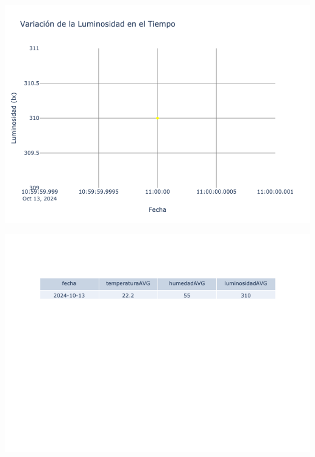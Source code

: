 \documentclass{article}
\begin{document}
    \noindent
    \begin{minipage}{0.48\textwidth}
        \centering
        \includegraphics[width=\textwidth]{../img/poli/LS502-90Dias-03-12-2024.png}
    \end{minipage}
    \hfill
    \begin{minipage}{0.48\textwidth}
        \centering
        \includegraphics[width=\textwidth]{../img/tables/CAVG502-90Dias-03-12-2024.png}
    \end{minipage}
    
\end{document}
